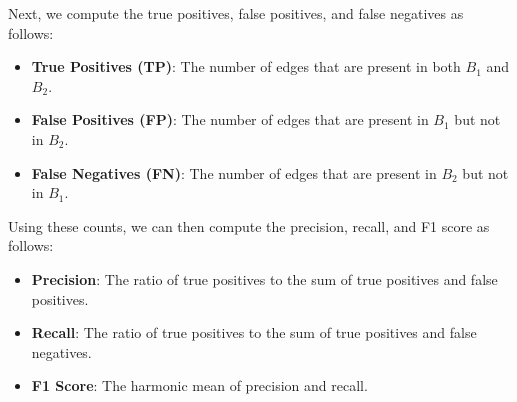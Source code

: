 Next, we compute the true positives, false positives, and false negatives as follows:

\begin{itemize}
    \item \textbf{True Positives (TP)}: The number of edges that are present in both $B_1$ and $B_2$.
    \item \textbf{False Positives (FP)}: The number of edges that are present in $B_1$ but not in $B_2$.
    \item \textbf{False Negatives (FN)}: The number of edges that are present in $B_2$ but not in $B_1$.
\end{itemize}

Using these counts, we can then compute the precision, recall, and F1 score as follows:

\begin{itemize}
    \item \textbf{Precision}: The ratio of true positives to the sum of true positives and false positives.
    \item \textbf{Recall}: The ratio of true positives to the sum of true positives and false negatives.
    \item \textbf{F1 Score}: The harmonic mean of precision and recall.
\end{itemize}